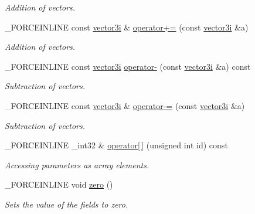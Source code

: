 \begin{DoxyCompactItemize}
\begin{DoxyCompactList}\small\item\em Addition of vectors. \end{DoxyCompactList}\item 
\hypertarget{classbt_1_1vector3i_ae35b2b1b803c298cc11bb6b043e84372}{\-\_\-\-F\-O\-R\-C\-E\-I\-N\-L\-I\-N\-E const \hyperlink{classbt_1_1vector3i}{vector3i} \& \hyperlink{classbt_1_1vector3i_ae35b2b1b803c298cc11bb6b043e84372}{operator+=} (const \hyperlink{classbt_1_1vector3i}{vector3i} \&a)}\label{classbt_1_1vector3i_ae35b2b1b803c298cc11bb6b043e84372}

\begin{DoxyCompactList}\small\item\em Addition of vectors. \end{DoxyCompactList}\item 
\hypertarget{classbt_1_1vector3i_ac88f6165cc210fa533b76143bdcc538d}{\-\_\-\-F\-O\-R\-C\-E\-I\-N\-L\-I\-N\-E const \hyperlink{classbt_1_1vector3i}{vector3i} \hyperlink{classbt_1_1vector3i_ac88f6165cc210fa533b76143bdcc538d}{operator-\/} (const \hyperlink{classbt_1_1vector3i}{vector3i} \&a) const }\label{classbt_1_1vector3i_ac88f6165cc210fa533b76143bdcc538d}

\begin{DoxyCompactList}\small\item\em Subtraction of vectors. \end{DoxyCompactList}\item 
\hypertarget{classbt_1_1vector3i_a5f3747ca5eb12743fa0a8f21f0f703a9}{\-\_\-\-F\-O\-R\-C\-E\-I\-N\-L\-I\-N\-E const \hyperlink{classbt_1_1vector3i}{vector3i} \& \hyperlink{classbt_1_1vector3i_a5f3747ca5eb12743fa0a8f21f0f703a9}{operator-\/=} (const \hyperlink{classbt_1_1vector3i}{vector3i} \&a)}\label{classbt_1_1vector3i_a5f3747ca5eb12743fa0a8f21f0f703a9}

\begin{DoxyCompactList}\small\item\em Subtraction of vectors. \end{DoxyCompactList}\item 
\hypertarget{classbt_1_1vector3i_a636099df8398591bf2fba999ca81764b}{\-\_\-\-F\-O\-R\-C\-E\-I\-N\-L\-I\-N\-E \-\_\-int32 \& \hyperlink{classbt_1_1vector3i_a636099df8398591bf2fba999ca81764b}{operator\mbox{[}$\,$\mbox{]}} (unsigned int id) const }\label{classbt_1_1vector3i_a636099df8398591bf2fba999ca81764b}

\begin{DoxyCompactList}\small\item\em Accessing parameters as array elements. \end{DoxyCompactList}\item 
\hypertarget{classbt_1_1vector3i_a4cc45ec50844af57ca58eb1f08dc4040}{\-\_\-\-F\-O\-R\-C\-E\-I\-N\-L\-I\-N\-E void \hyperlink{classbt_1_1vector3i_a4cc45ec50844af57ca58eb1f08dc4040}{zero} ()}\label{classbt_1_1vector3i_a4cc45ec50844af57ca58eb1f08dc4040}

\begin{DoxyCompactList}\small\item\em Sets the value of the fields to zero. \end{DoxyCompactList}\end{DoxyCompactItemize}
